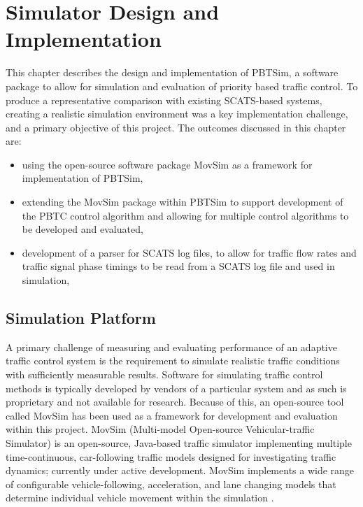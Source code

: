 \chapter{Simulator Design and Implementation}

This chapter describes the design and implementation of PBTSim, a software package to allow for simulation and evaluation of priority based traffic control. To produce a representative comparison with existing SCATS-based systems, creating a realistic simulation environment was a key implementation challenge, and a primary objective of this project. The outcomes discussed in this chapter are:

\begin{itemize}
\item using the open-source software package MovSim as a framework for implementation of PBTSim,
\item extending the MovSim package within PBTSim to support development of the PBTC control algorithm and allowing for multiple control algorithms to be developed and evaluated,
\item development of a parser for SCATS log files, to allow for traffic flow rates and traffic signal phase timings to be read from a SCATS log file and used in simulation,
\end{itemize}

\section{Simulation Platform}

A primary challenge of measuring and evaluating performance of an adaptive traffic control system is the requirement to simulate realistic traffic conditions with sufficiently measurable results. Software for simulating traffic control methods is typically developed by vendors of a particular system and as such is proprietary and not available for research. Because of this, an open-source tool called MovSim has been used as a framework for development and evaluation within this project. MovSim (Multi-model Open-source Vehicular-traffic Simulator) is an open-source, Java-based traffic simulator implementing multiple time-continuous, car-following traffic models designed for investigating traffic dynamics; currently under active development. MovSim implements a wide range of configurable vehicle-following, acceleration, and lane changing models that determine individual vehicle movement within the simulation \cite{movsim,kesting2013traffic}.

